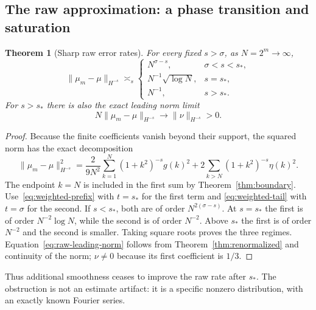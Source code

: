 \documentclass[11pt,a4paper]{article}
\numberwithin{equation}{section}
\newtheorem{theorem}{Theorem}[section]
\theoremstyle{definition}
\theoremstyle{remark}
\newcommand{\norm}[1]{\lVert #1\rVert}
\begin{document}
\subsection{The raw approximation: a phase transition and saturation}
\begin{theorem}[Sharp raw error rates]
\label{thm:raw-rate}
For every fixed $s>\sigma$, as $N=2^m\to\infty$,
\begin{equation}
 \boxed{\quad
 \norm{\mu_m-\mu}_{H^{-s}}\asymp_s
 \begin{cases}
 N^{\sigma-s},&\sigma<s<s_*,\\
 N^{-1}\sqrt{\log N},&s=s_*,\\
 N^{-1},&s>s_*.
 \end{cases}\quad}
 \label{eq:raw-rates}
\end{equation}
For $s>s_*$ there is also the exact leading norm limit
\begin{equation}
 N\norm{\mu_m-\mu}_{H^{-s}}\longrightarrow\norm{\nu}_{H^{-s}}>0.
 \label{eq:raw-leading-norm}
\end{equation}
\end{theorem}
\begin{proof}
Because the finite coefficients vanish beyond their support, the squared norm
has the exact decomposition
\begin{equation}
 \norm{\mu_m-\mu}_{H^{-s}}^2
 =\frac{2}{9N^2}\sum_{k=1}^{N}(1+k^2)^{-s}g(k)^2
   +2\sum_{k>N}(1+k^2)^{-s}\eta(k)^2.
 \label{eq:exact-norm-decomposition}
\end{equation}
The endpoint $k=N$ is included in the first sum by Theorem~\ref{thm:boundary}.
Use~\eqref{eq:weighted-prefix} with $t=s_*$ for the first term and
\eqref{eq:weighted-tail} with $t=\sigma$ for the second. If $s<s_*$, both are
of order $N^{2(\sigma-s)}$. At $s=s_*$ the first is of order
$N^{-2}\log N$, while the second is of order $N^{-2}$. Above $s_*$ the first
is of order $N^{-2}$ and the second is smaller. Taking square roots proves the
three regimes. Equation~\eqref{eq:raw-leading-norm} follows from
Theorem~\ref{thm:renormalized} and continuity of the norm; $\nu\ne0$ because
its first coefficient is $1/3$.
\end{proof}

Thus additional smoothness ceases to improve the raw rate after $s_*$. The
obstruction is not an estimate artifact: it is a specific nonzero distribution,
with an exactly known Fourier series.
\end{document}
